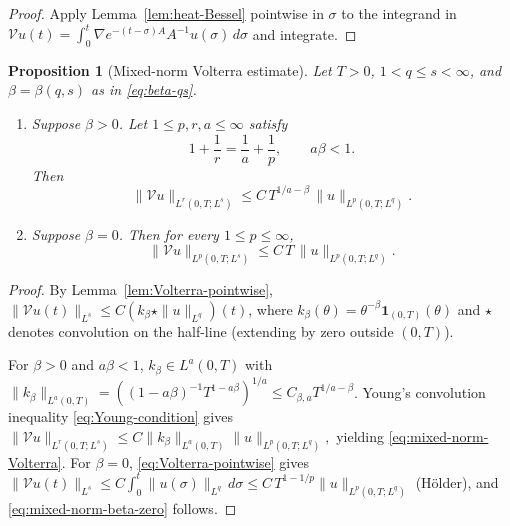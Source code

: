 \documentclass[11pt,reqno]{amsart}
\newtheorem{proposition}[theorem]{Proposition}
\theoremstyle{definition}
\theoremstyle{remark}
\newcommand{\Vop}{\mathcal{V}}
\begin{document}
\begin{proof}
Apply Lemma~\ref{lem:heat-Bessel} pointwise in $\sigma$ to the integrand in $\Vop u(t)=\int_0^t \nabla e^{-(t-\sigma)A}A^{-1}u(\sigma)\,d\sigma$ and integrate.
\end{proof}

\begin{proposition}[Mixed-norm Volterra estimate]\label{prop:mixed-norm-Volterra}
Let $T>0$, $1<q\le s<\infty$, and $\beta=\beta(q,s)$ as in \eqref{eq:beta-qs}.
\begin{enumerate}[label=(\roman*),leftmargin=2em]
\item Suppose $\beta>0$. Let $1\le p,r,a\le\infty$ satisfy
\begin{equation}\label{eq:Young-condition}
        1+\frac{1}{r}=\frac{1}{a}+\frac{1}{p},\qquad a\beta<1.
\end{equation}
Then
\begin{equation}\label{eq:mixed-norm-Volterra}
        \|\Vop u\|_{L^{r}(0,T;L^{s})}
        \le C\,T^{1/a-\beta}\,\|u\|_{L^{p}(0,T;L^{q})}.
\end{equation}
\item Suppose $\beta=0$. Then for every $1\le p\le\infty$,
\begin{equation}\label{eq:mixed-norm-beta-zero}
        \|\Vop u\|_{L^{p}(0,T;L^{s})}\le C\,T\,\|u\|_{L^{p}(0,T;L^{q})}.
\end{equation}
\end{enumerate}
\end{proposition}

\begin{proof}
By Lemma~\ref{lem:Volterra-pointwise}, $\|\Vop u(t)\|_{L^{s}}\le C(k_\beta\star\|u\|_{L^{q}})(t)$, where $k_\beta(\theta)=\theta^{-\beta}\mathbf 1_{(0,T)}(\theta)$ and $\star$ denotes convolution on the half-line (extending by zero outside $(0,T)$).

For $\beta>0$ and $a\beta<1$, $k_\beta\in L^{a}(0,T)$ with $\|k_\beta\|_{L^{a}(0,T)}=((1-a\beta)^{-1}T^{1-a\beta})^{1/a}\le C_{\beta,a}T^{1/a-\beta}$. Young's convolution inequality \eqref{eq:Young-condition} gives
$
        \|\Vop u\|_{L^{r}(0,T;L^{s})}\le C\|k_\beta\|_{L^{a}(0,T)}\|u\|_{L^{p}(0,T;L^{q})},
$
yielding \eqref{eq:mixed-norm-Volterra}. For $\beta=0$, \eqref{eq:Volterra-pointwise} gives $\|\Vop u(t)\|_{L^{s}}\le C\int_0^t\|u(\sigma)\|_{L^{q}}\,d\sigma\le C\,T^{1-1/p}\|u\|_{L^{p}(0,T;L^{q})}$ (Hölder), and \eqref{eq:mixed-norm-beta-zero} follows.
\end{proof}
\end{document}
